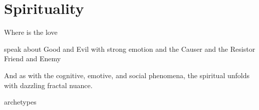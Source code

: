 \chapter{Spirituality}


Where is the love



speak about Good and Evil with strong emotion
and the Causer and the Resistor
Friend and Enemy

And as with the cognitive, emotive, and social phenomena, the spiritual unfolds with dazzling fractal nuance. 




archetypes





